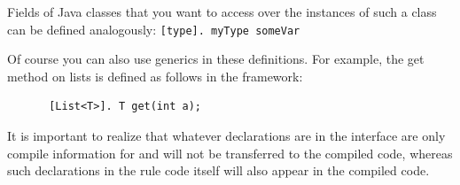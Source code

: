 Fields of Java classes that you want to access over the instances of such a class can be defined analogously: \texttt{[type]. myType someVar}

Of course you can also use generics in these definitions. For example, the get method on lists is defined as follows in the \vonda framework:

\begin{figure}[htbp]
\centering
\small
\begin{lstlisting}
 [List<T>]. T get(int a);
\end{lstlisting}
\end{figure}
%


It is important to realize that whatever declarations are in the interface are only compile information for \vonda and will not be transferred to the compiled code, whereas such declarations in the rule code itself will also appear in the compiled code.



